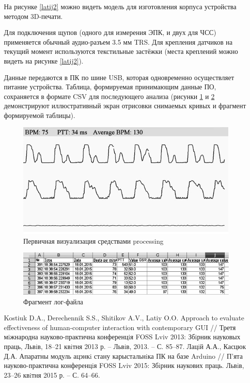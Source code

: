 \documentclass[10pt, a5paper]{article}
\begin{document}
На рисунке \ref{latij2} можно видеть модель для изготовления корпуса устройства методом 3D-печати.

Для подключения щупов (одного для измерения ЭПК, и двух для ЧСС) применяется обычный аудио-разъем 3.5 мм TRS. Для крепления датчиков на текущий момент используются текстильные застёжки (места креплений можно видеть на рисунке \ref{latij2}).


Данные передаются в ПК по шине USB, которая одновременно осуществляет питание устройства. Таблица, формируемая принимающим данные ПО, сохраняется в формате CSV для последующего анализа (рисунки \ref{latij4} и \ref{latij5} демонстрируют иллюстративный экран отрисовки снимаемых кривых и фрагмент формируемой таблицы).


\begin{figure}[h!]
  \centering 
  \includegraphics[scale=0.5]{18_2015_fig4}
  \caption{Первичная визуализация средствами processing} \label{latij4}
\end{figure}

\begin{figure}[h!]
  \centering 
  \includegraphics[scale=0.67]{18_2015_fig5}
  \caption{Фрагмент лог-файла} \label{latij5}
\end{figure}

\begin{thebibliography}{9}
 {Kostiuk D.A., Derechennik S.S., Shitikov A.V., Latiy O.O. Approach to evaluate effectiveness of human-computer interaction with contemporary GUI // Третя мiжнародна науково-практична конференцiя FOSS Lviv 2013: Збiрник науковых праць, Львiв, 18–21 квiтня 2013 р. – Львiв, 2013. – С. 85–87.}
 {Лацiй А.А., Касцюк Д.А. Апаратны модуль ацэнкi стану карыстальнiка ПК на базе Arduino // П'ята науково-практична конференцiя FOSS Lviv 2015: Збiрник наукових праць. Львiв, 23–26 квiтня 2015 р. – С. 64–66.}\end{thebibliography}
\end{document}
